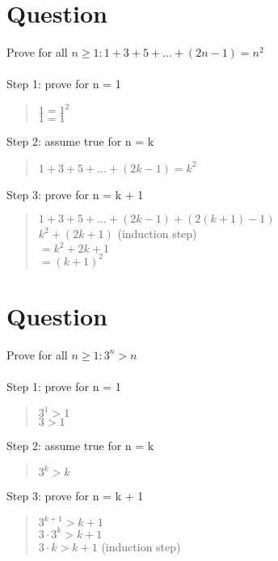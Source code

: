 \documentclass{article}
\begin{document}
\section{Question}
Prove for all \({n ≥ 1: 1 + 3 + 5 + ... + (2n - 1) = n^2}\) \\ \\
Step 1: prove for n = 1 \\
\begin{quote}
\(1 = 1^2\) \\
\(1 = 1\)
\end{quote}

Step 2: assume true for n = k \\
\begin{quote}
\(1 + 3 + 5 + . . . + (2k - 1) = k^2\)
\end{quote}

Step 3: prove for n = k + 1 \\
\begin{quote}
\(1 + 3 + 5 + . . . + (2k - 1) + ( 2 (k + 1) - 1)\) \\
\(k^2 + (2k + 1)\) (induction step) \\
\(= k^2 + 2k + 1\) \\
\(= (k + 1)^2\)
\end{quote}

\section{Question}
Prove for all \({n ≥ 1: 3^n > n}\) \\ \\
Step 1: prove for n = 1 \\
\begin{quote}
\(3^1 > 1\) \\
\(3 > 1\)
\end{quote}

Step 2: assume true for n = k \\
\begin{quote}
\(3^k > k\)
\end{quote}

Step 3: prove for n = k + 1 \\
\begin{quote}
\(3^{k+1} > k + 1\) \\
\(3 \cdot 3^k > k + 1\) \\
\(3 \cdot k > k + 1\) (induction step)\\

\end{quote}
\end{document}
